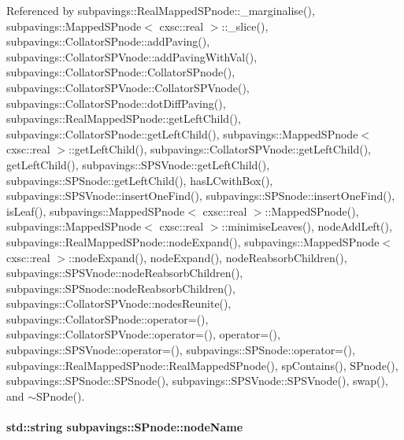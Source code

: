 \-Referenced by subpavings\-::\-Real\-Mapped\-S\-Pnode\-::\-\_\-marginalise(), subpavings\-::\-Mapped\-S\-Pnode$<$ cxsc\-::real $>$\-::\-\_\-slice(), subpavings\-::\-Collator\-S\-Pnode\-::add\-Paving(), subpavings\-::\-Collator\-S\-P\-Vnode\-::add\-Paving\-With\-Val(), subpavings\-::\-Collator\-S\-Pnode\-::\-Collator\-S\-Pnode(), subpavings\-::\-Collator\-S\-P\-Vnode\-::\-Collator\-S\-P\-Vnode(), subpavings\-::\-Collator\-S\-Pnode\-::dot\-Diff\-Paving(), subpavings\-::\-Real\-Mapped\-S\-Pnode\-::get\-Left\-Child(), subpavings\-::\-Collator\-S\-Pnode\-::get\-Left\-Child(), subpavings\-::\-Mapped\-S\-Pnode$<$ cxsc\-::real $>$\-::get\-Left\-Child(), subpavings\-::\-Collator\-S\-P\-Vnode\-::get\-Left\-Child(), get\-Left\-Child(), subpavings\-::\-S\-P\-S\-Vnode\-::get\-Left\-Child(), subpavings\-::\-S\-P\-Snode\-::get\-Left\-Child(), has\-L\-Cwith\-Box(), subpavings\-::\-S\-P\-S\-Vnode\-::insert\-One\-Find(), subpavings\-::\-S\-P\-Snode\-::insert\-One\-Find(), is\-Leaf(), subpavings\-::\-Mapped\-S\-Pnode$<$ cxsc\-::real $>$\-::\-Mapped\-S\-Pnode(), subpavings\-::\-Mapped\-S\-Pnode$<$ cxsc\-::real $>$\-::minimise\-Leaves(), node\-Add\-Left(), subpavings\-::\-Real\-Mapped\-S\-Pnode\-::node\-Expand(), subpavings\-::\-Mapped\-S\-Pnode$<$ cxsc\-::real $>$\-::node\-Expand(), node\-Expand(), node\-Reabsorb\-Children(), subpavings\-::\-S\-P\-S\-Vnode\-::node\-Reabsorb\-Children(), subpavings\-::\-S\-P\-Snode\-::node\-Reabsorb\-Children(), subpavings\-::\-Collator\-S\-P\-Vnode\-::nodes\-Reunite(), subpavings\-::\-Collator\-S\-Pnode\-::operator=(), subpavings\-::\-Collator\-S\-P\-Vnode\-::operator=(), operator=(), subpavings\-::\-S\-P\-S\-Vnode\-::operator=(), subpavings\-::\-S\-P\-Snode\-::operator=(), subpavings\-::\-Real\-Mapped\-S\-Pnode\-::\-Real\-Mapped\-S\-Pnode(), sp\-Contains(), \-S\-Pnode(), subpavings\-::\-S\-P\-Snode\-::\-S\-P\-Snode(), subpavings\-::\-S\-P\-S\-Vnode\-::\-S\-P\-S\-Vnode(), swap(), and $\sim$\-S\-Pnode().

\hypertarget{classsubpavings_1_1SPnode_a90803dc066d955d4aec89c00879ff610}{
\paragraph[{node\-Name}]{\setlength{\rightskip}{0pt plus 5cm}std\-::string {\bf subpavings\-::\-S\-Pnode\-::node\-Name}}}\label{classsubpavings_1_1SPnode_a90803dc066d955d4aec89c00879ff610}



